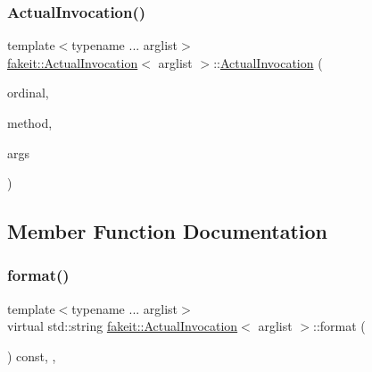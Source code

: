 \mbox{\label{structfakeit_1_1ActualInvocation_a99175c134863f4d8320da8b5fe4bd223}} 
\subsubsection{\texorpdfstring{ActualInvocation()}{ActualInvocation()}\hspace{0.1cm}{\footnotesize\ttfamily [9/9]}}
{\footnotesize\ttfamily template$<$typename ... arglist$>$ \\
\mbox{\hyperlink{structfakeit_1_1ActualInvocation}{fakeit\+::\+Actual\+Invocation}}$<$ arglist $>$\+::\mbox{\hyperlink{structfakeit_1_1ActualInvocation}{Actual\+Invocation}} (\begin{DoxyParamCaption}\item[{unsigned int}]{ordinal,  }\item[{\mbox{\hyperlink{structfakeit_1_1MethodInfo}{Method\+Info}} \&}]{method,  }\item[{const typename \mbox{\hyperlink{structfakeit_1_1production__arg}{fakeit\+::production\+\_\+arg}}$<$ arglist $>$\+::type...}]{args }\end{DoxyParamCaption})\hspace{0.3cm}{\ttfamily [inline]}}



\subsection{Member Function Documentation}
\mbox{\label{structfakeit_1_1ActualInvocation_a84fc89352c4dfc5ff8b24239901f809a}} 
\subsubsection{\texorpdfstring{format()}{format()}\hspace{0.1cm}{\footnotesize\ttfamily [1/9]}}
{\footnotesize\ttfamily template$<$typename ... arglist$>$ \\
virtual std\+::string \mbox{\hyperlink{structfakeit_1_1ActualInvocation}{fakeit\+::\+Actual\+Invocation}}$<$ arglist $>$\+::format (\begin{DoxyParamCaption}{ }\end{DoxyParamCaption}) const\hspace{0.3cm}{\ttfamily [inline]}, {\ttfamily [override]}, {\ttfamily [virtual]}}



